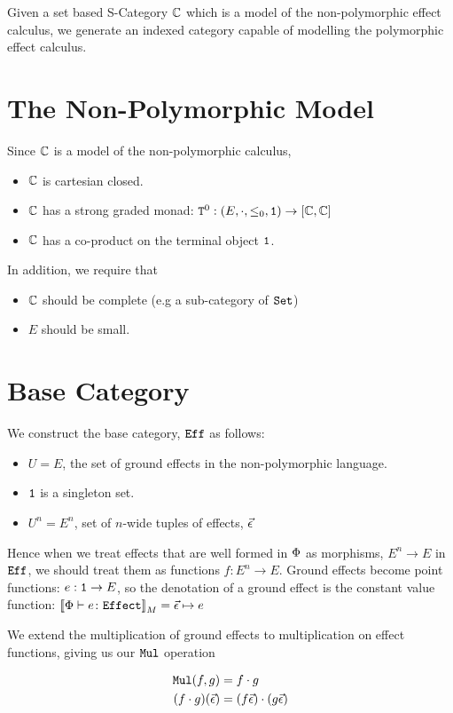 \documentclass{report}
\begin{document}
Given a set based S-Category $\C$ which is a model of the non-polymorphic effect calculus, we generate an indexed category capable of modelling the polymorphic effect calculus.
\section{The Non-Polymorphic Model}
Since $\C$ is a model of the non-polymorphic calculus,
\begin{itemize}
    \item $\C$ is cartesian closed.
    \item $\C$ has a strong graded monad: $\Tz{}{}: (E, \dot, \subeffect_0, \1) \rightarrow [\C, \C]$
    \item $\C$ has a co-product on the terminal object $\1$.
\end{itemize}

In addition, we require that 
\begin{itemize}
    \item $\C$ should be complete (e.g a sub-category of $\set$)
    \item $E$ should be small.
\end{itemize}


\section{Base Category}

We construct the base category, $\Eff$ as follows:

\begin{itemize}
    \item $U = E$, the set of ground effects in the non-polymorphic language.
    \item $\1$ is a singleton set.
    \item $U^n = E^n$, set of $n$-wide tuples of effects, $\vec{\e}$
\end{itemize}

Hence when we treat effects that are well formed in $\P$ as morphisms, $E^n \rightarrow E$ in $\Eff$, we should treat them as functions $f: E^n \rightarrow E$. Ground effects become point functions: $e: \1 \rightarrow E$, so the denotation of a ground effect is the constant value function: $\deno{\typerelation{\P}{e}{\effect}} = \ev \mapsto e$

We extend the multiplication of ground effects to multiplication on effect functions, giving us our $\Mul$ operation

\begin{align}
    \Mul(f, g) & = f\dot g\\
    (f\dot g)(\ev) & = (f\ev)\dot(g\ev)\\
\end{align}
\end{document}
